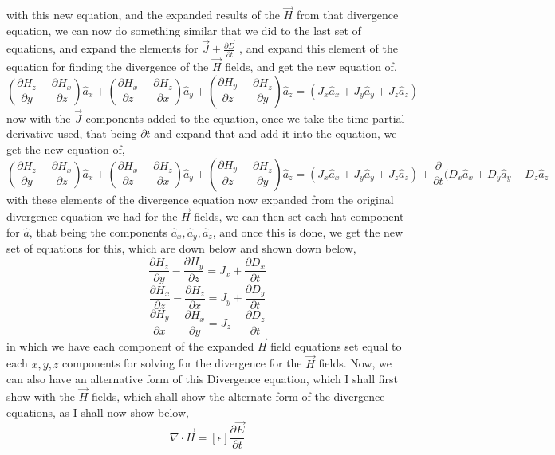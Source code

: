 \documentclass[]{article}
\begin{document}
with this new equation, and the expanded results of the $\vec{H}$ from that divergence equation, we can now do something similar that we did to the last set of equations, and expand the elements for $\vec{J} + \frac{\partial{\vec{D}}}{\partial{t}}$ , and expand this element of the equation for finding the divergence of the $\vec{H}$ fields, and get the new equation of,
\begin{equation}
(\frac{\partial{H}_z}{\partial{y}} - \frac{\partial{H}_x}{\partial{z}})\hat{a}_x + (\frac{\partial{H}_x}{\partial{z}} - \frac{\partial{H}_z}{\partial{x}})\hat{a}_y + (\frac{\partial{H}_y}{\partial{z}} - \frac{\partial{H}_z}{\partial{y}})\hat{a}_z = (J_x\hat{a}_x + J_y\hat{a}_y + J_z\hat{a}_z)
\end{equation}
now with the $\vec{J}$ components added to the equation, once we take the time partial derivative used, that being $\partial{t}$ and expand that and add it into the equation, we get the new equation of,
\begin{equation}
(\frac{\partial{H}_z}{\partial{y}} - \frac{\partial{H}_x}{\partial{z}})\hat{a}_x + (\frac{\partial{H}_x}{\partial{z}} - \frac{\partial{H}_z}{\partial{x}})\hat{a}_y + (\frac{\partial{H}_y}{\partial{z}} - \frac{\partial{H}_z}{\partial{y}})\hat{a}_z = (J_x\hat{a}_x + J_y\hat{a}_y + J_z\hat{a}_z) + \frac{\partial}{\partial{t}}(D_x\hat{a}_x+D_y\hat{a}_y+D_z\hat{a}_z
\end{equation}
with these elements of the divergence equation now expanded from the original divergence equation we had for the $\vec{H}$ fields, we can then set each hat component for $\hat{a}$, that being the components $\hat{a}_x,\hat{a}_y,\hat{a}_z$, and once this is done, we get the new set of equations for this, which are down below and shown down below,
\[\frac{\partial{H}_z}{\partial{y}} - \frac{\partial{H}_y}{\partial{z}} = J_x + \frac{\partial{D}_x}{\partial{t}} \] 
\[\frac{\partial{H}_x}{\partial{z}} - \frac{\partial{H}_z}{\partial{x}} = J_y + \frac{\partial{D}_y}{\partial{t}} \]
\[\frac{\partial{H}_y}{\partial{x}} - \frac{\partial{H}_x}{\partial{y}} = J_z + \frac{\partial{D}_z}{\partial{t}} \]
in which we have each component of the expanded $\vec{H}$ field equations set equal to each $x,y,z$ components for solving for the divergence for the $\vec{H}$ fields. Now, we can also have an alternative form of this Divergence equation, which I shall first show with the $\vec{H}$ fields, which shall show the alternate form of the divergence equations, as I shall now show below,
\begin{equation}
\nabla \cdot \vec{H} = [\epsilon] \frac{\partial{\vec{E}}}{\partial{t}}
\end{equation}
\end{document}
